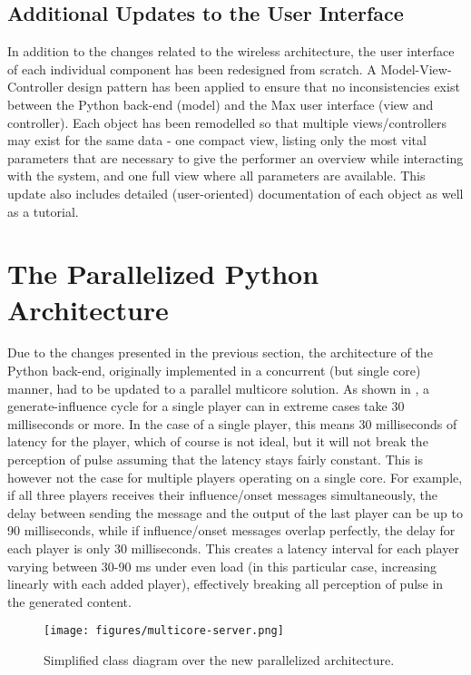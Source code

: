 \subsection{Additional Updates to the User Interface}
In addition to the changes related to the wireless architecture, the user interface of each individual component has been redesigned from  scratch. A Model-View-Controller design pattern has been applied to ensure that no inconsistencies exist between the Python back-end (model) and the Max user interface (view and controller). Each object has been remodelled so that multiple views/controllers may exist for the same data - one compact view, listing only the most vital parameters that are necessary to give the performer an overview while interacting with the system, and one full view where all parameters are available. This update also includes detailed (user-oriented) documentation of each object as well as a tutorial.


\section{The Parallelized Python Architecture}\label{ssec:python-architecture}
Due to the changes presented in the previous section, the architecture of the Python back-end, originally implemented in a concurrent (but single core) manner, had to be updated to a parallel multicore solution. As shown in \cite{somaxtheory2021}, a generate-influence cycle for a single player can in extreme cases take 30 milliseconds or more. In the case of a single player, this means 30 milliseconds of latency for the player, which of course is not ideal, but it will not break the perception of pulse assuming that the latency stays fairly constant. This is however not the case for multiple players operating on a single core. For example, if all three players receives their influence/onset messages simultaneously, the delay between sending the message and the output of the last player can be up to 90 milliseconds, while if influence/onset messages overlap perfectly, the delay for each player is only 30 milliseconds. This creates a latency interval for each player varying between 30-90 ms under even load (in this particular case, increasing linearly with each added player), effectively breaking all perception of pulse in the generated content.

 \begin{figure}[h!]
    \centering        
 	\texttt{[image: figures/multicore-server.png]}
    \caption{Simplified class diagram over the new parallelized architecture.}
    \label{fig:multicore-server-uml}
\end{figure}

